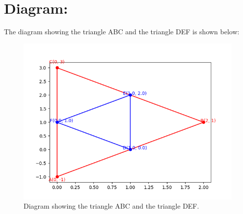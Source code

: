 \documentclass[a4paper, 12pt]{article}
\begin{document}
\section{Diagram: }
The diagram showing the triangle ABC and the triangle DEF is shown below:
\begin{figure}[h]
    \centering
    \includegraphics[width=0.8\linewidth]{figs/triangle_diagram.png}
    \caption{Diagram showing the triangle ABC and the triangle DEF.}
    \label{fig:triangle_diagram}
\end{figure}
\end{document}
